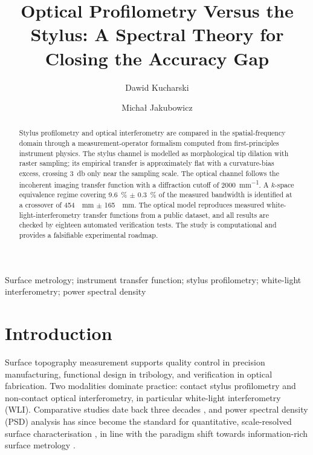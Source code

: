 \documentclass{imeko_wc}
\begin{document}
\title{Optical Profilometry Versus the Stylus: A Spectral Theory for Closing the Accuracy Gap}

\author[a1]{Dawid Kucharski}
\author[a1]{Micha{\l} Jakubowicz}



\maketitle %

\begin{abstract}
Stylus profilometry and optical interferometry are compared in the spatial-frequency domain through a measurement-operator formalism computed from first-principles instrument physics. The stylus channel is modelled as morphological tip dilation with raster sampling; its empirical transfer is approximately flat with a curvature-bias excess, crossing \qty{3}{\decibel} only near the sampling scale. The optical channel follows the incoherent imaging transfer function with a diffraction cutoff of \qty{2000}{mm^{-1}}. A $k$-space equivalence regime covering \qty{9.6}{\percent} $\pm$ \qty{0.3}{\percent} of the measured bandwidth is identified at a crossover of \qty{454}{\per\milli\metre} $\pm$ \qty{165}{\per\milli\metre}. The optical model reproduces measured white-light-interferometry transfer functions from a public dataset, and all results are checked by eighteen automated verification tests. The study is computational and provides a falsifiable experimental roadmap.
\end{abstract}

\begin{keywords}
Surface metrology; instrument transfer function; stylus profilometry; white-light interferometry; power spectral density
\end{keywords}

\section{Introduction}

\label{sec:introduction}
Surface topography measurement supports quality control in precision manufacturing, functional design in tribology, and verification in optical fabrication. Two modalities dominate practice: contact stylus profilometry and non-contact optical interferometry, in particular white-light interferometry (WLI). Comparative studies date back three decades \cite{poon1995comparison}, and power spectral density (PSD) analysis has since become the standard for quantitative, scale-resolved surface characterisation \cite{jacobs2017quantitative}, in line with the paradigm shift towards information-rich surface metrology \cite{jiang2007paradigm}.
\end{document}
